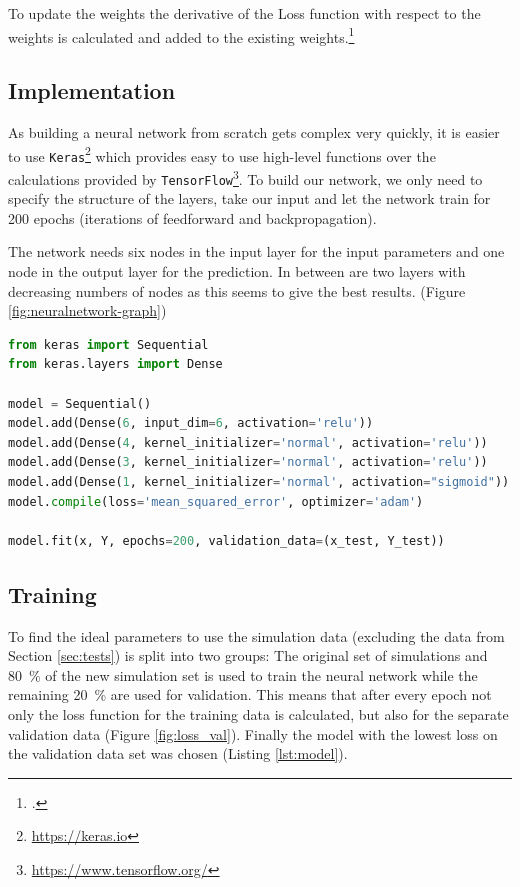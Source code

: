 To update the weights the derivative of the Loss function with respect to the weights is calculated and added to the existing weights.\footcite{NN-python}

\subsection{Implementation}

As building a neural network from scratch gets complex very quickly, it is easier to use \texttt{Keras}\footnote{\url{https://keras.io}} which provides easy to use high-level functions over the calculations provided by \texttt{TensorFlow}\footnote{\url{https://www.tensorflow.org/}}. To build our network, we only need to specify the structure of the layers, take our input and let the network train for 200 epochs (iterations of feedforward and backpropagation). 

The network needs six nodes in the input layer for the input parameters and one node in the output layer for the prediction. In between are two layers with decreasing numbers of nodes as this seems to give the best results. (Figure \ref{fig:neuralnetwork-graph})

\begin{lstlisting}[language=Python,caption=the used model as Keras code,label=lst:model]
from keras import Sequential
from keras.layers import Dense

model = Sequential()
model.add(Dense(6, input_dim=6, activation='relu'))
model.add(Dense(4, kernel_initializer='normal', activation='relu'))
model.add(Dense(3, kernel_initializer='normal', activation='relu'))
model.add(Dense(1, kernel_initializer='normal', activation="sigmoid"))
model.compile(loss='mean_squared_error', optimizer='adam')

model.fit(x, Y, epochs=200, validation_data=(x_test, Y_test))

\end{lstlisting}

\subsection{Training}

To find the ideal parameters to use the simulation data (excluding the data from Section \ref{sec:tests}) is split into two groups: The original set of simulations and \SI{80}{\percent} of the new simulation set is used to train the neural network while the remaining \SI{20}{\percent} are used for validation. This means that after every epoch not only the loss function for the training data is calculated, but also for the separate validation data (Figure \ref{fig:loss_val}). Finally the model with the lowest loss on the validation data set was chosen (Listing \ref{lst:model}).


